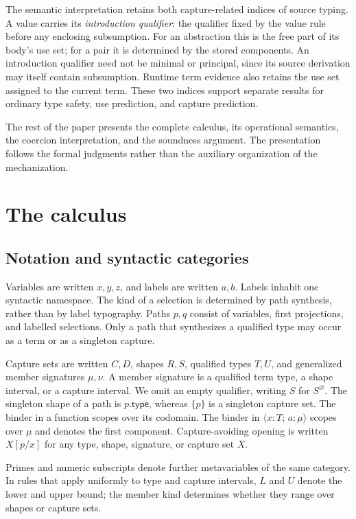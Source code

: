\documentclass[acmsmall,screen,nonacm]{acmart}
\newcommand{\cempty}{\varnothing}
\newcommand{\cset}[1]{\{#1\}}
\newcommand{\capt}[2]{#1^{#2}}
\newcommand{\sing}[1]{#1.\mathsf{type}}
\newcommand{\pairshape}[4]{\langle #1\!:\!#2;\,#3\!:\!#4\rangle}
\newcommand{\subst}[3]{#1[#2/#3]}
\begin{document}
The semantic interpretation retains both capture-related indices of source
typing.  A value carries its \emph{introduction qualifier}: the qualifier
fixed by the value rule before any enclosing subsumption.  For an abstraction
this is the free part of its body's use set; for a pair it is determined by
the stored components.  An introduction qualifier need not be minimal or
principal, since its source derivation may itself contain subsumption.
Runtime term evidence also retains the use set assigned to the current term.
These two indices support separate results for ordinary type safety, use
prediction, and capture prediction.

The rest of the paper presents the complete calculus, its operational
semantics, the coercion interpretation, and the soundness argument. The
presentation follows the formal judgments rather than the auxiliary
organization of the mechanization.

\section{The calculus}
\label{sec:calculus}

\subsection{Notation and syntactic categories}

Variables are written \(x,y,z\), and labels are written \(a,b\). Labels
inhabit one syntactic namespace. The kind of a selection is determined by
path synthesis, rather than by label typography. Paths \(p,q\) consist of variables, first
projections, and labelled selections. Only a path that synthesizes a
qualified type may occur as a term or as a singleton capture.

Capture sets are written \(C,D\), shapes \(R,S\), qualified types \(T,U\),
and generalized member signatures \(\mu,\nu\). A member signature is a
qualified term type, a shape interval, or a capture interval. We omit an
empty qualifier, writing \(S\) for \(\capt{S}{\cempty}\). The singleton
shape of a path is \(\sing p\), whereas \(\cset p\) is a singleton capture
set. The binder in a function scopes over its codomain. The binder in
\(\pairshape{x}{T}{a}{\mu}\) scopes over \(\mu\) and denotes the first
component. Capture-avoiding opening is written \(\subst{X}{p}{x}\) for any
type, shape, signature, or capture set \(X\).

Primes and numeric subscripts denote further metavariables of the same
category.  In rules that apply uniformly to type and capture intervals,
\(L\) and \(U\) denote the lower and upper bound; the member kind determines
whether they range over shapes or capture sets.
\end{document}
